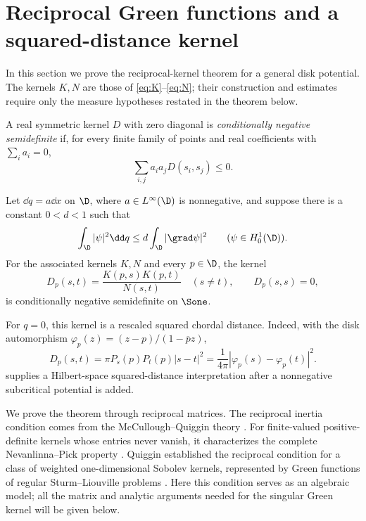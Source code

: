 \section{Reciprocal Green functions and a squared-distance kernel}\label{sec:reciprocal}

In this section we prove the reciprocal-kernel theorem for a general disk potential. The kernels $K,N$ are those of \eqref{eq:K}--\eqref{eq:N}; their construction and estimates require only the measure hypotheses restated in the theorem below.

A real symmetric kernel $D$ with zero diagonal is \emph{conditionally negative semidefinite} if, for every finite family of points and real coefficients with $\sum_i a_i=0$,
\[
\sum_{i,j}a_i a_jD(s_i,s_j)\le0.
\]

\begin{theorem}\label{thm:negative-kernel}
Let $\dd q=a\dd x$ on $\D$, where $a\in L^\infty(\D)$ is nonnegative, and suppose there is a constant $0<d<1$ such that
\[
\int_\D|\psi|^2\dd q\le d\int_\D|\grad\psi|^2
\qquad(\psi\in H^1_0(\D)).
\]
For the associated kernels $K,N$ and every $p\in\D$, the kernel
\begin{equation}\label{eq:D}
D_p(s,t)=\frac{K(p,s)K(p,t)}{N(s,t)}\quad(s\ne t),
\qquad D_p(s,s)=0,
\end{equation}
is conditionally negative semidefinite on $\Sone$.
\end{theorem}

\begin{remark}\label{rem:zero-potential}
For $q=0$, this kernel is a rescaled squared chordal distance. Indeed, with the disk automorphism $\varphi_p(z)=(z-p)/(1-\overline pz)$,
\[
D_p(s,t)=\pi P_s(p)P_t(p)|s-t|^2
=\frac1{4\pi}|\varphi_p(s)-\varphi_p(t)|^2.
\]
 supplies a Hilbert-space squared-distance interpretation after a nonnegative subcritical potential is added.
\end{remark}

We prove the theorem through reciprocal matrices. The reciprocal inertia condition comes from the McCullough--Quiggin theory \cite{McCullough1994,Quiggin1994}. For finite-valued positive-definite kernels whose entries never vanish, it characterizes the complete Nevanlinna--Pick property \cite[Corollary~1.12]{AglerMcCarthy2000}. Quiggin established the reciprocal condition for a class of weighted one-dimensional Sobolev kernels, represented by Green functions of regular Sturm--Liouville problems \cite[Section~2.2, Corollary~2.2.2 and Theorem~2.2.3]{Quiggin1994}. Here this condition serves as an algebraic model; all the matrix and analytic arguments needed for the singular Green kernel will be given below.

